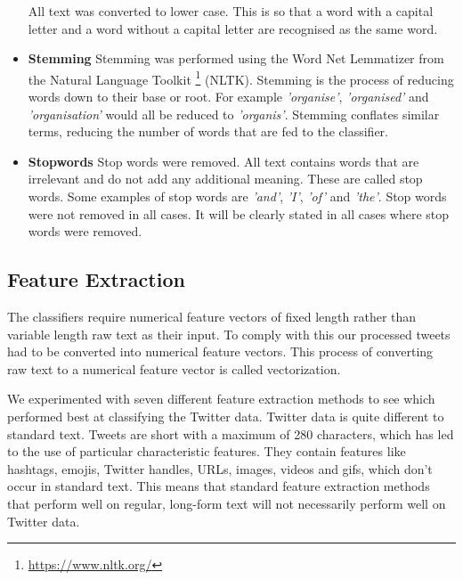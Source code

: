 \begin{itemize}
    All text was converted to lower case. This is so that a word with a capital letter and a word without a capital letter are recognised as the same word.
    \item \textbf{Stemming}\newline
    Stemming was performed using the Word Net Lemmatizer from the Natural Language Toolkit \footnote{\url{https://www.nltk.org/}} (NLTK). Stemming is the process of reducing words down to their base or root. For example \emph{'organise'}, \emph{'organised'} and \emph{'organisation'} would all be reduced to \emph{'organis'}. Stemming conflates similar terms, reducing the number of words that are fed to the classifier.
    \item \textbf{Stopwords}\newline
    Stop words were removed. All text contains words that are irrelevant and do not add any additional meaning. These are called stop words. Some examples of stop words are \emph{'and'}, \emph{'I'}, \emph{'of'} and \emph{'the'}. Stop words were not removed in all cases. It will be clearly stated in all cases where stop words were removed.
\end{itemize}



\subsection{Feature Extraction}

The classifiers require numerical feature vectors of fixed length rather than variable length raw text as their input. To comply with this our processed tweets had to be converted into numerical feature vectors. This process of converting raw text to a numerical feature vector is called vectorization.

We experimented with seven different feature extraction methods to see which performed best at classifying the Twitter data. Twitter data is quite different to standard text. Tweets are short with a maximum of 280 characters, which has led to the use of particular characteristic features. They contain features like hashtags, emojis, Twitter handles, URLs, images, videos and gifs, which don't occur in standard text. This means that standard feature extraction methods that perform well on regular, long-form text will not necessarily perform well on Twitter data.

